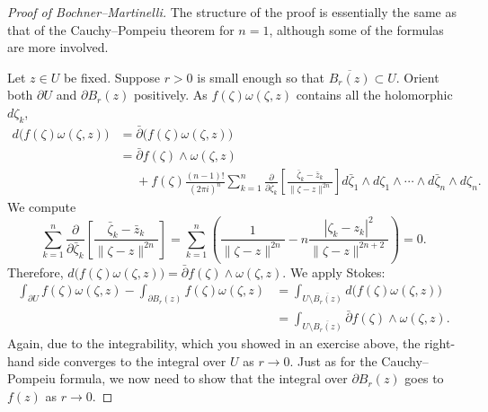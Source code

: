 \documentclass[12pt,openany]{book}
\newcommand{\snorm}[1]{\lVert {#1} \rVert}
\newcommand{\abs}[1]{\left\lvert {#1} \right\rvert}
\theoremstyle{plain}
\theoremstyle{remark}
\theoremstyle{definition}
\theoremstyle{exercise}
\theoremstyle{example}
\begin{document}
\begin{proof}[Proof of Bochner--Martinelli]
The structure of the proof is essentially the same as that of
the Cauchy--Pompeiu theorem for $n=1$, although some of the formulas are
more involved.

Let $z \in U$ be fixed.  Suppose $r > 0$ is small enough so that
$\overline{B_r(z)} \subset U$.  Orient both
$\partial U$ and $\partial B_r(z)$
positively.  As
$f(\zeta) \omega(\zeta,z)$ contains all the holomorphic $d\zeta_k$,
\begin{equation*}
\begin{split}
d \bigl( f(\zeta) \omega(\zeta,z) \bigr)
& =
\bar{\partial} \bigl( f(\zeta) \omega(\zeta,z) \bigr)
\\
& =
\bar{\partial} f(\zeta) \wedge \omega(\zeta,z)
\\
& \phantom{=} +
f(\zeta)
\frac{(n-1)!}{{(2\pi i)}^n}
\sum_{k=1}^n
\frac{\partial}{\partial \bar{\zeta}_k} \left[
\frac{\bar{\zeta}_k-\bar{z}_k}{\snorm{\zeta-z}^{2n}}
\right]
d\bar{\zeta}_1 \wedge d\zeta_1 \wedge
\cdots \wedge
d\bar{\zeta}_n \wedge d\zeta_n .
\end{split}
\end{equation*}
We compute
\begin{equation*}
\sum_{k=1}^n
\frac{\partial}{\partial \bar{\zeta}_k}
\left[
\frac{\bar{\zeta}_k-\bar{z}_k}{\snorm{\zeta-z}^{2n}}
\right]
=
\sum_{k=1}^n
\left(
\frac{1}{\snorm{\zeta-z}^{2n}}
-n
\frac{\abs{\zeta_k-z_k}^2}{\snorm{\zeta-z}^{2n+2}}
\right)
= 0 .
\end{equation*}
Therefore,
$d \bigl( f(\zeta) \omega(\zeta,z) \bigr) = \bar{\partial} f(\zeta) \wedge
\omega(\zeta,z)$.
We apply Stokes:
\begin{equation*}
\begin{split}
\int_{\partial U}
f(\zeta) \omega(\zeta,z)
-
\int_{\partial B_r(z)}
f(\zeta) \omega(\zeta,z)
& =
\int_{U \setminus \overline{B_r(z)}}
d \bigl( f(\zeta) \omega(\zeta,z) \bigr)
\\
& =
\int_{U \setminus \overline{B_r(z)}}
\bar{\partial} f(\zeta) \wedge \omega(\zeta,z) .
\end{split}
\end{equation*}
Again, due to the integrability, which you showed in an exercise above,
the right-hand side converges to the integral over $U$ as $r \to 0$.
Just as for the Cauchy--Pompeiu formula, we now need to show that the integral
over $\partial B_r(z)$ goes to $f(z)$ as $r \to 0$.


\end{proof}
\end{document}

